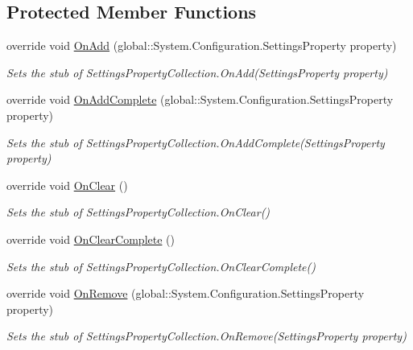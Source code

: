 \subsection*{Protected Member Functions}
\begin{DoxyCompactItemize}
\item 
override void \hyperlink{class_system_1_1_configuration_1_1_fakes_1_1_stub_settings_property_collection_ae696fa405492404337cbc52fe7cde2cb}{On\-Add} (global\-::\-System.\-Configuration.\-Settings\-Property property)
\begin{DoxyCompactList}\small\item\em Sets the stub of Settings\-Property\-Collection.\-On\-Add(\-Settings\-Property property)\end{DoxyCompactList}\item 
override void \hyperlink{class_system_1_1_configuration_1_1_fakes_1_1_stub_settings_property_collection_aa3460b3b5d3d311a03a6620a5067af6f}{On\-Add\-Complete} (global\-::\-System.\-Configuration.\-Settings\-Property property)
\begin{DoxyCompactList}\small\item\em Sets the stub of Settings\-Property\-Collection.\-On\-Add\-Complete(\-Settings\-Property property)\end{DoxyCompactList}\item 
override void \hyperlink{class_system_1_1_configuration_1_1_fakes_1_1_stub_settings_property_collection_a7e77903f69943014a020e4b541e4645b}{On\-Clear} ()
\begin{DoxyCompactList}\small\item\em Sets the stub of Settings\-Property\-Collection.\-On\-Clear()\end{DoxyCompactList}\item 
override void \hyperlink{class_system_1_1_configuration_1_1_fakes_1_1_stub_settings_property_collection_ae6d9f535c4266e11e60691836fecbb9f}{On\-Clear\-Complete} ()
\begin{DoxyCompactList}\small\item\em Sets the stub of Settings\-Property\-Collection.\-On\-Clear\-Complete()\end{DoxyCompactList}\item 
override void \hyperlink{class_system_1_1_configuration_1_1_fakes_1_1_stub_settings_property_collection_ad07987296809b0ea29241acaad247c05}{On\-Remove} (global\-::\-System.\-Configuration.\-Settings\-Property property)
\begin{DoxyCompactList}\small\item\em Sets the stub of Settings\-Property\-Collection.\-On\-Remove(\-Settings\-Property property)\end{DoxyCompactList}\item 

\end{DoxyCompactItemize}
